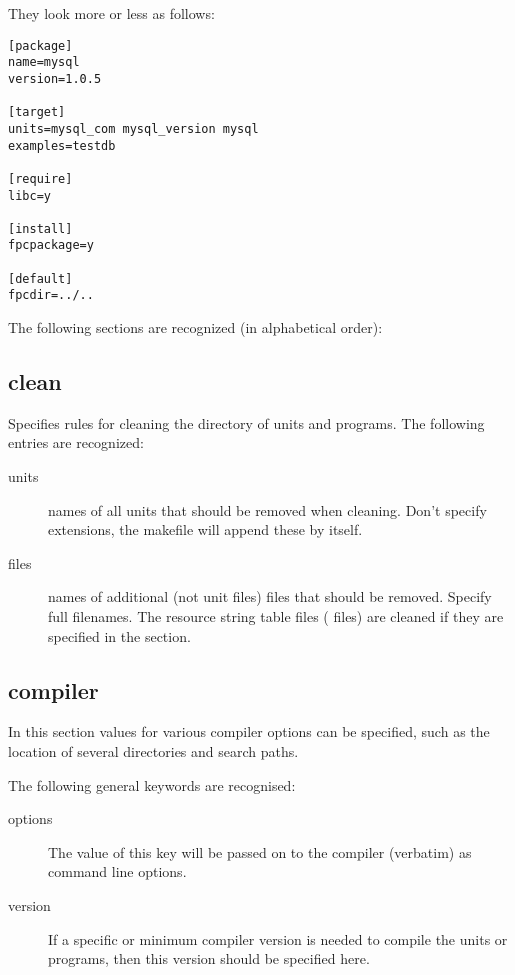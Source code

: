 They look more or less as follows:
\begin{verbatim}
[package]
name=mysql
version=1.0.5

[target]
units=mysql_com mysql_version mysql
examples=testdb

[require]
libc=y

[install]
fpcpackage=y

[default]
fpcdir=../..
\end{verbatim}

The following sections are recognized (in alphabetical order):

\subsection{clean}
Specifies rules for cleaning the directory of units and programs.
The following entries are recognized:
\begin{description}
\item[units] names of all units that should be removed when cleaning.
Don't specify extensions, the makefile will append these by itself.
\item[files] names of additional (not unit files) files that should 
be removed. Specify full filenames. The resource string table files
( files) are cleaned if they are specified in the  section.
\end{description}

\subsection{compiler}
In this section values for various compiler options can be specified, 
such as the location of several directories and search paths.

The following general keywords are recognised:
\begin{description}
\item[options] The value of this key will be passed on to the compiler
(verbatim) as command line options.
\item[version] If a specific or minimum compiler version is needed to
compile the units or programs, then this version should be specified here.
\end{description}

